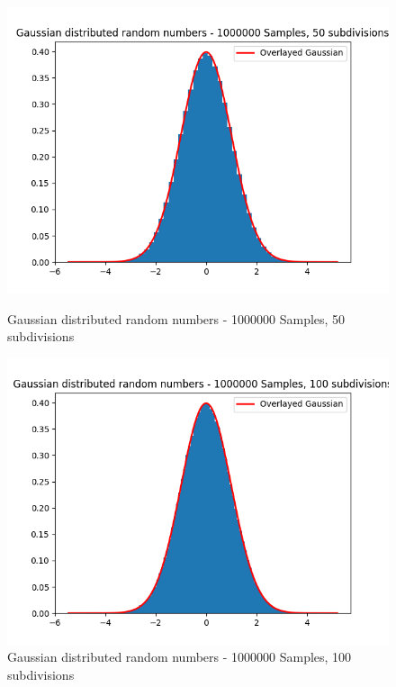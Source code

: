 \documentclass[11pt]{article}
\begin{document}
\begin{figure}[H]
    \centering
    \begin{minipage}{0.48\textwidth}
        \centering
        \includegraphics[width=\textwidth]{Gaussian distributed random numbers - 1000000 Samples, 50 subdivisions.png}
        \caption{Gaussian distributed random numbers - 1000000 Samples, 50 subdivisions}
        \label{fig:15}
    \end{minipage}\hfill
    \begin{minipage}{0.48\textwidth}
        \centering
        \includegraphics[width=\textwidth]{Gaussian distributed random numbers - 1000000 Samples, 100 subdivisions.png}
        \caption{Gaussian distributed random numbers - 1000000 Samples, 100 subdivisions}
        \label{fig:16}
    \end{minipage}
\end{figure}
\end{document}
